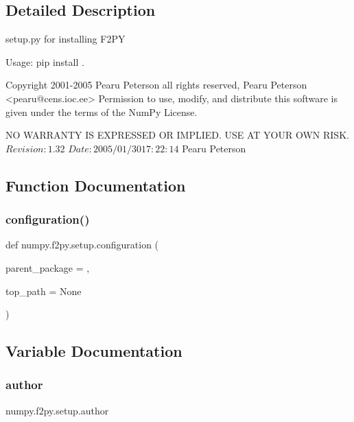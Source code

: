 \subsection{Detailed Description}
\begin{DoxyVerb}setup.py for installing F2PY

Usage:
   pip install .

Copyright 2001-2005 Pearu Peterson all rights reserved,
Pearu Peterson <pearu@cens.ioc.ee>
Permission to use, modify, and distribute this software is given under the
terms of the NumPy License.

NO WARRANTY IS EXPRESSED OR IMPLIED.  USE AT YOUR OWN RISK.
$Revision: 1.32 $
$Date: 2005/01/30 17:22:14 $
Pearu Peterson\end{DoxyVerb}
 

\subsection{Function Documentation}
\mbox{\label{namespacenumpy_1_1f2py_1_1setup_aaf8fa608c3836535fc5c99e9d7b4935a}} 
\subsubsection{\texorpdfstring{configuration()}{configuration()}}
{\footnotesize\ttfamily def numpy.\+f2py.\+setup.\+configuration (\begin{DoxyParamCaption}\item[{}]{parent\+\_\+package = {\ttfamily \textquotesingle{}\textquotesingle{}},  }\item[{}]{top\+\_\+path = {\ttfamily None} }\end{DoxyParamCaption})}



\subsection{Variable Documentation}
\mbox{\label{namespacenumpy_1_1f2py_1_1setup_abbdc9e3b0eb7088442ea593d55275dac}} 
\subsubsection{\texorpdfstring{author}{author}}
{\footnotesize\ttfamily numpy.\+f2py.\+setup.\+author}

